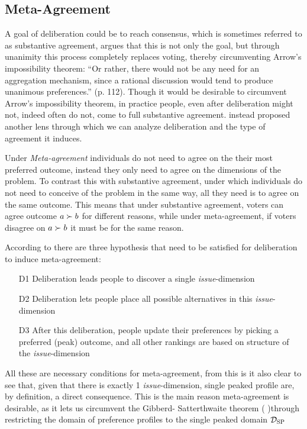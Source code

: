\subsection{Meta-Agreement}

A goal of deliberation could be to reach consensus, which is sometimes referred to as substantive agreement, \citet{elsterMARKETFORUMThree2002} argues that this is not only the goal, but through unanimity this process completely replaces voting, thereby circumventing Arrow's impossibility theorem: ``Or rather, there would not be any need for an aggregation mechanism, since a rational discussion would tend to produce unanimous preferences.” (p. 112). Though it would be desirable to circumvent Arrow's impossibility theorem, in practice people, even after deliberation might not, indeed often do not, come to full substantive agreement. \citet{listTwoConceptsAgreement2002} instead proposed another lens through which we can analyze deliberation and the type of agreement it induces.

Under \emph{Meta-agreement} individuals do not need to agree on the their most preferred outcome, instead they only need to agree on the dimensions of the problem. To contrast this with substantive agreement, under which individuals do not need to conceive of the problem in the same way, all they need is to agree on the same outcome. This means that under substantive agreement, voters can agree outcome $a \succ b$ for different reasons, while under meta-agreement, if voters disagree on $a \succ b$ it must be for the same reason.

According to \citet{listTwoConceptsAgreement2002} there are three hypothesis that need to be satisfied for deliberation to induce meta-agreement:
\begin{enumerate}
	\label{list:meta-agreement-checklist}
	\setlength\itemsep{1px}
	\item [D1] Deliberation leads people to discover a single \textit{issue}-dimension
	\item [D2] Deliberation lets people place all possible alternatives in this \textit{issue}-dimension
	\item [D3] After this deliberation, people update their preferences by picking a preferred (peak) outcome, and all other rankings are based on structure of the \textit{issue}-dimension
\end{enumerate}

All these are necessary conditions for meta-agreement, from this is it also clear to see that, given that there is exactly 1 \textit{issue}-dimension, single peaked profile are, by definition, a direct consequence. This is the main reason meta-agreement is desirable, as it lets us circumvent the Gibberd- Satterthwaite theorem (\citep{gibbardManipulationVotingSchemes1973} \citep{satterthwaiteStrategyproofnessArrowsConditions1975})through restricting the domain of preference profiles to the single peaked domain $\mathcal{D}_{\textnormal{SP}}$



